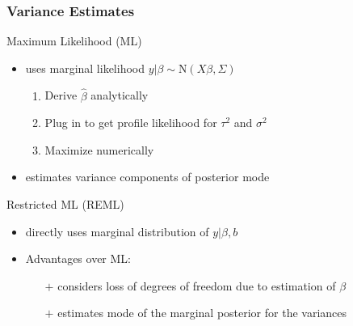 \documentclass[final]{beamer}
\begin{document}
\begin{frame}
\frametitle{Variance Estimates}

\textcolor{beamer@postercolour}{Maximum Likelihood (ML)} 

\begin{itemize}
\item uses marginal likelihood $y|\beta \sim \mathrm{N}(X\beta,\Sigma)$ 

\begin{enumerate}
\item Derive $\hat{\beta}$ analytically
\item Plug in to get profile likelihood for $\tau^2$ and $\sigma^2$
\item Maximize numerically
\end{enumerate}

\item estimates variance components of posterior mode
\end{itemize}

\vspace{1em}

\textcolor{beamer@postercolour}{Restricted ML (REML)}

\begin{itemize}
\item directly uses marginal distribution of $y|\beta, b$

\item Advantages over ML:
\begin{itemize}
\item[$+$] considers loss of degrees of freedom due to estimation of $\beta$ 
\item[$+$] estimates mode of the marginal posterior for the variances
\end{itemize}
\end{itemize}


\end{frame}
\end{document}
